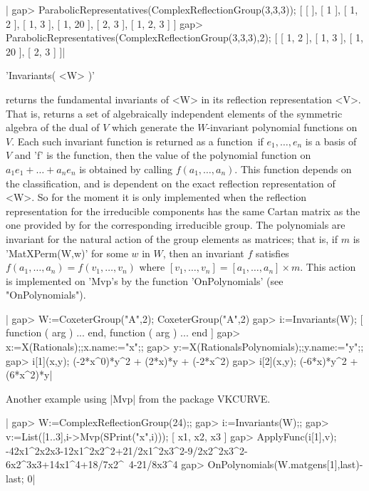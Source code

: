 |    gap> ParabolicRepresentatives(ComplexReflectionGroup(3,3,3));
    [ [  ], [ 1 ], [ 1, 2 ], [ 1, 3 ], [ 1, 20 ], [ 2, 3 ], [ 1, 2, 3 ] ]
    gap> ParabolicRepresentatives(ComplexReflectionGroup(3,3,3),2);
    [ [ 1, 2 ], [ 1, 3 ], [ 1, 20 ], [ 2, 3 ] ]|


'Invariants( <W> )'

returns  the fundamental invariants of <W> in its reflection representation
<V>.  That is, returns  a set of  algebraically independent elements of the
symmetric  algebra  of  the  dual  of  $V$ which generate the $W$-invariant
polynomial  functions on $V$. Each such invariant function is returned as a
{\GAP}  function\:\ if $e_1,\ldots,e_n$  is a basis  of $V$ and  'f' is the
{\GAP}   function,   then   the   value   of  the  polynomial  function  on
$a_1e_1+\ldots+a_n  e_n$ is  obtained by  calling $f(a_1,\ldots,a_n)$. This
function  depends  on  the  classification,  and  is dependent on the exact
reflection  representation of <W>. So for the moment it is only implemented
when  the reflection representation for  the irreducible components has the
same  Cartan matrix as the one  provided by {\CHEVIE} for the corresponding
irreducible  group. The polynomials are invariant for the natural action of
the group elements as matrices; that is, if $m$ is 'MatXPerm(W,w)' for some
$w$   in  $W$,   then  an   invariant  $f$   satisfies  $f(a_1,\ldots,a_n)=
f(v_1,\ldots,v_n)$  where $[v_1,\ldots,v_n]=[a_1,\ldots,a_n]\times m$. This
action  is  implemented  on  'Mvp's  by  the  function 'OnPolynomials' (see
"OnPolynomials").

|    gap> W:=CoxeterGroup("A",2);
    CoxeterGroup("A",2)
    gap> i:=Invariants(W);
    [ function ( arg ) ... end, function ( arg ) ... end ]
    gap> x:=X(Rationals);;x.name:="x";;
    gap> y:=X(RationalsPolynomials);;y.name:="y";;
    gap> i[1](x,y);
    (-2*x^0)*y^2 + (2*x)*y + (-2*x^2)
    gap> i[2](x,y);
    (-6*x)*y^2 + (6*x^2)*y|

Another example using |Mvp| from the package VKCURVE.

|    gap> W:=ComplexReflectionGroup(24);;
    gap> i:=Invariants(W);;
    gap> v:=List([1..3],i->Mvp(SPrint("x",i)));
    [ x1, x2, x3 ]
    gap> ApplyFunc(i[1],v);
    -42x1^2x2x3-12x1^2x2^2+21/2x1^2x3^2-9/2x2^2x3^2-6x2^3x3+14x1^4+18/7x2^\
    4-21/8x3^4
    gap> OnPolynomials(W.matgens[1],last)-last;
    0|

